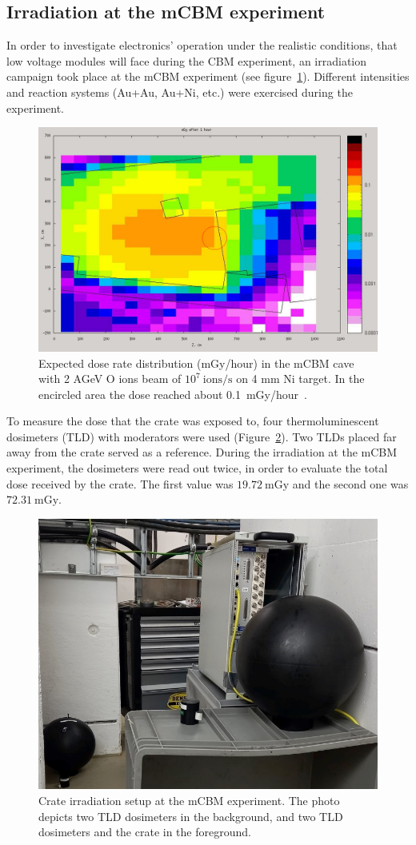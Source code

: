 \subsection{Irradiation at the mCBM experiment}
In order to investigate electronics' operation under the realistic conditions, that low voltage modules will face during the CBM experiment, an irradiation campaign took place at the \gls{mCBM} experiment (see figure~\ref{fig:CBM1}). Different intensities and reaction systems (Au+Au, Au+Ni, etc.) were exercised during the experiment.
\begin{figure}[!h]
    \centering
    \includegraphics[width=0.65\columnwidth]{Chapter4/images/dose1.jpg}
    \caption{Expected dose rate distribution (mGy/hour) in the \gls{mCBM} cave with 2 AGeV O ions beam of $10^{7}\mathrm{\ ions/s}$ on 4 mm Ni target. In the encircled area the dose reached about 0.1~mGy/hour~\cite{fluka_senger}.}
     \label{fig:CBM1}
\end{figure}


To measure the dose that the crate was exposed to, four thermoluminescent dosimeters (\gls{TLD}) with moderators were used (Figure~\ref{fig:crate}). Two TLDs placed far away from the crate served as a reference. During the irradiation at the \gls{mCBM} experiment, the dosimeters were read out twice, in order to evaluate the total dose received by the crate. The first value was $19.72\mathrm{\ mGy}$ and  the second one was $72.31\mathrm{\ mGy}$. 


\newpage
\begin{figure}[!h]
    \centering
    \includegraphics[width=0.5\columnwidth]{Chapter4/images/crate.jpg}
    \caption{Crate irradiation setup at the \gls{mCBM} experiment. The photo depicts two TLD dosimeters in the background, and two TLD dosimeters and the crate in the foreground.}
    \label{fig:crate}
\end{figure}

